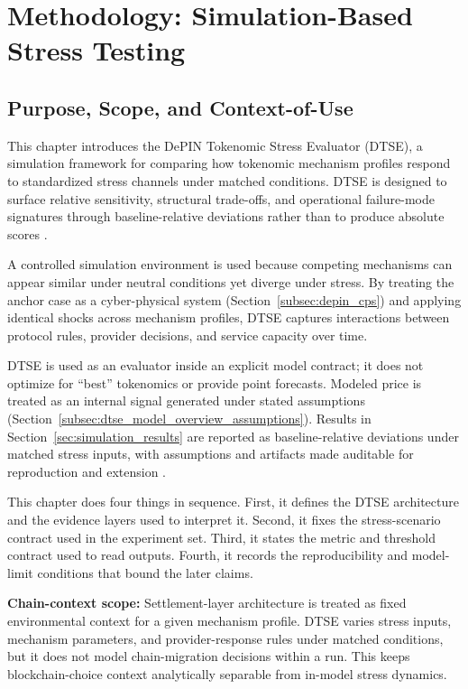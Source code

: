 
\section{Methodology: Simulation-Based Stress Testing}
\label{sec:methodology}

\subsection{Purpose, Scope, and Context-of-Use}
This chapter introduces the DePIN Tokenomic Stress Evaluator (DTSE), a simulation framework for comparing how tokenomic mechanism profiles respond to standardized stress channels under matched conditions. DTSE is designed to surface relative sensitivity, structural trade-offs, and operational failure-mode signatures through baseline-relative deviations rather than to produce absolute scores \cite{Morris2019, Braakman2022}.

A controlled simulation environment is used because competing mechanisms can appear similar under neutral conditions yet diverge under stress. By treating the anchor case as a cyber-physical system (Section~\ref{subsec:depin_cps}) and applying identical shocks across mechanism profiles, DTSE captures interactions between protocol rules, provider decisions, and service capacity over time.

DTSE is used as an evaluator inside an explicit model contract; it does not optimize for ``best'' tokenomics or provide point forecasts. Modeled price is treated as an internal signal generated under stated assumptions (Section~\ref{subsec:dtse_model_overview_assumptions}). Results in Section~\ref{sec:simulation_results} are reported as baseline-relative deviations under matched stress inputs, with assumptions and artifacts made auditable for reproduction and extension \cite{Morris2019}.

This chapter does four things in sequence. First, it defines the DTSE architecture and the evidence layers used to interpret it. Second, it fixes the stress-scenario contract used in the experiment set. Third, it states the metric and threshold contract used to read outputs. Fourth, it records the reproducibility and model-limit conditions that bound the later claims.

\noindent\textbf{Chain-context scope:} Settlement-layer architecture is treated as fixed environmental context for a given mechanism profile. DTSE varies stress inputs, mechanism parameters, and provider-response rules under matched conditions, but it does not model chain-migration decisions within a run. This keeps blockchain-choice context analytically separable from in-model stress dynamics.


